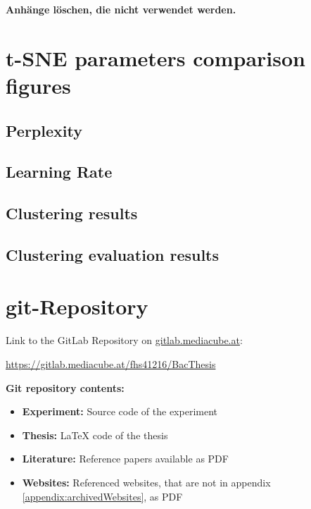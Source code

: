 \begin{appendices}
\textbf{\color{red} Anhänge löschen, die nicht verwendet werden.}

\section{t-SNE parameters comparison figures}
\label{appendix:tSNEParameters}
\subsection{Perplexity}
\label{appendix:tSNEParametersPerplexity}
% 

\subsection{Learning Rate}
\label{appendix:tSNEParametersLearningRate}
% 


\subsection{Clustering results}
\label{appendix:clusteringResults}
% 
% 

\subsection{Clustering evaluation results}
\label{appendix:clusteringEvaluationResults}
% 









\section{git-Repository}



Link to the GitLab Repository on {\url{gitlab.mediacube.at}}:

{\color{red}\url{https://gitlab.mediacube.at/fhs41216/BacThesis}}

\textbf{Git repository contents:}

\begin{itemize}
	\item \textbf{Experiment:} Source code of the experiment
	\item \textbf{Thesis:} LaTeX code of the thesis
	\item \textbf{Literature:} Reference papers available as PDF
	\item \textbf{Websites:} Referenced websites, that are not in appendix \ref{appendix:archivedWebsites}, as PDF
\end{itemize}




\end{appendices}
